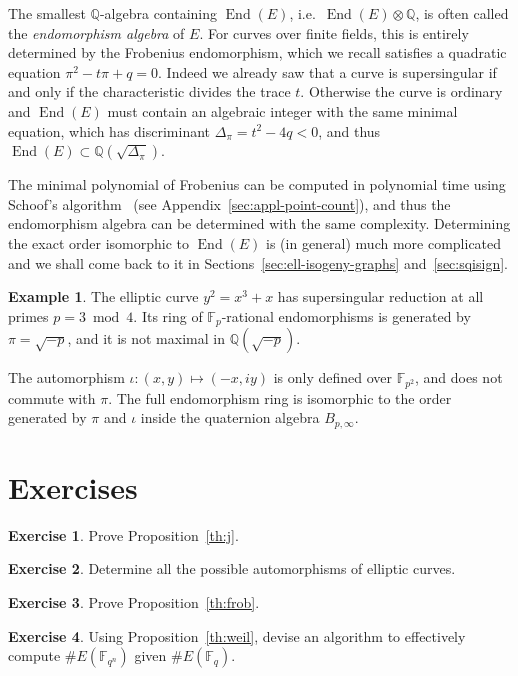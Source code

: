 \documentclass[10pt]{article}
\theoremstyle{plain}
\theoremstyle{definition}
\newtheorem{example}[theorem]{Example}
\newtheorem{exercise}{Exercise}[part]
\DeclareMathOperator{\End}{End} %
\def\F{\ensuremath{\mathbb{F}}}
\begin{document}
The smallest $ℚ$-algebra containing $\End(E)$, i.e.\ $\End(E)⊗ℚ$, is
often called the \emph{endomorphism algebra} of $E$. %
For curves over finite fields, this is entirely determined by the
Frobenius endomorphism, which we recall satisfies a quadratic equation
$π^2 - tπ + q = 0$. %
Indeed we already saw that a curve is supersingular if and only if the
characteristic divides the trace $t$. %
Otherwise the curve is ordinary and $\End(E)$ must contain an
algebraic integer with the same minimal equation, which has
discriminant $Δ_π=t^2-4q<0$, and thus $\End(E)⊂ℚ(\sqrt{Δ_π})$.

The minimal polynomial of Frobenius can be computed in polynomial time
using Schoof's algorithm~\cite{schoof85} (see
Appendix~\ref{sec:appl-point-count}), and thus the endomorphism
algebra can be determined with the same complexity.
Determining the exact order isomorphic to $\End(E)$ is (in general)
much more complicated and we shall come back to it in
Sections~\ref{sec:ell-isogeny-graphs} and~\ref{sec:sqisign}.

\begin{example}
  The elliptic curve $y^2=x^3+x$ has supersingular reduction at all
  primes $p=3\bmod 4$. %
  Its ring of $\F_p$-rational endomorphisms is generated by
  $π=\sqrt{-p}$, and it is not maximal in $ℚ(\sqrt{-p})$.

  The automorphism $ι:(x,y)↦(-x,iy)$ is only defined over $\F_{p^2}$,
  and does not commute with $π$. %
  The full endomorphism ring is isomorphic to the order generated by
  $π$ and $ι$ inside the quaternion algebra $B_{p,∞}$.
\end{example}

\section*{Exercises}

\begin{exercise}
  Prove Proposition~\ref{th:j}.
\end{exercise}

\begin{exercise}
  Determine all the possible automorphisms of elliptic curves.
\end{exercise}

\begin{exercise}
  Prove Proposition~\ref{th:frob}.
\end{exercise}

\begin{exercise}
  Using Proposition~\ref{th:weil}, devise an algorithm to effectively
  compute $\#E(\F_{q^n})$ given $\#E(\F_q)$.
\end{exercise}
\end{document}
